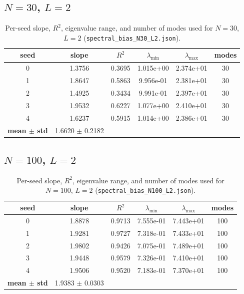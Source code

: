 \subsection{$N=30$, $L=2$}
\begin{table}[H]
\centering
\caption{Per-seed slope, $R^2$, eigenvalue range, and number of modes used for $N=30$, $L=2$ (\texttt{spectral\_bias\_N30\_L2.json}).}
\label{tab:slopeA-N30-L2}
\begin{tabular}{c c c c c c}
\toprule
seed & slope & $R^2$ & $\lambda_{\min}$ & $\lambda_{\max}$ & modes \\
\midrule
0 & 1.3756 & 0.3695 & 1.015e+00 & 2.374e+01 & 30 \\
1 & 1.8647 & 0.5863 & 9.956e-01 & 2.381e+01 & 30 \\
2 & 1.4925 & 0.3434 & 9.991e-01 & 2.397e+01 & 30 \\
3 & 1.9532 & 0.6227 & 1.077e+00 & 2.410e+01 & 30 \\
4 & 1.6237 & 0.5915 & 1.014e+00 & 2.386e+01 & 30 \\
\midrule
\textbf{mean $\pm$ std} & 1.6620 $\pm$ 0.2182 & \multicolumn{4}{l}{} \\
\bottomrule
\end{tabular}
\end{table}

\subsection{$N=100$, $L=2$}
\begin{table}[H]
\centering
\caption{Per-seed slope, $R^2$, eigenvalue range, and number of modes used for $N=100$, $L=2$ (\texttt{spectral\_bias\_N100\_L2.json}).}
\label{tab:slopeA-N100-L2}
\begin{tabular}{c c c c c c}
\toprule
seed & slope & $R^2$ & $\lambda_{\min}$ & $\lambda_{\max}$ & modes \\
\midrule
0 & 1.8878 & 0.9713 & 7.555e-01 & 7.443e+01 & 100 \\
1 & 1.9281 & 0.9727 & 7.318e-01 & 7.433e+01 & 100 \\
2 & 1.9802 & 0.9426 & 7.075e-01 & 7.489e+01 & 100 \\
3 & 1.9448 & 0.9579 & 7.326e-01 & 7.410e+01 & 100 \\
4 & 1.9506 & 0.9520 & 7.183e-01 & 7.370e+01 & 100 \\
\midrule
\textbf{mean $\pm$ std} & 1.9383 $\pm$ 0.0303 & \multicolumn{4}{l}{} \\
\bottomrule
\end{tabular}
\end{table}

